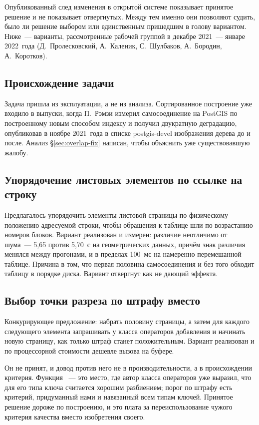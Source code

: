 Опубликованный след изменения в открытой системе показывает принятое решение и
не показывает отвергнутых. Между тем именно они позволяют судить, было ли
решение выбором или единственным пришедшим в голову вариантом. Ниже~---
варианты, рассмотренные рабочей группой в декабре 2021~--- январе 2022~года
(Д.~Пролесковский, А.~Каленик, С.~Шулбаков, А.~Бородин, А.~Коротков).

\subsection{Происхождение задачи}

Задача пришла из эксплуатации, а не из анализа. Сортированное построение уже
входило в выпуски, когда П.~Рэмзи измерил самосоединение на PostGIS по
построенному новым способом индексу и получил двукратную деградацию,
опубликовав в ноябре 2021~года в списке postgis-devel изображения дерева до и
после. Анализ §\ref{sec:overlap-fix} написан, чтобы объяснить уже существовавшую
жалобу.

\subsection{Упорядочение листовых элементов по ссылке на строку}

Предлагалось упорядочить элементы листовой страницы по физическому положению
адресуемой строки, чтобы обращения к таблице шли по возрастанию номеров блоков.
Вариант реализован и измерен: различие неотличимо от шума~--- 5,65 против
5,70~с на геометрических данных, причём знак различия менялся между прогонами,
и в пределах 100~мс на намеренно перемешанной таблице. Причина в том, что
первая половина самосоединения и без того обходит таблицу в порядке диска.
Вариант отвергнут как не дающий эффекта.

\subsection{Выбор точки разреза по штрафу вместо }

Конкурирующее предложение: набрать половину страницы, а затем для каждого
следующего элемента запрашивать у класса операторов  добавления и
начинать новую страницу, как только штраф станет положительным. Вариант
реализован и по процессорной стоимости дешевле вызова  на
буфере.

Он не принят, и довод против него не в производительности, а в происхождении
критерия. Функция ~--- это место, где автор класса операторов
уже выразил, что для его типа ключа считается хорошим разбиением; порог по
штрафу есть критерий, придуманный нами и навязанный всем типам ключей.
Принятое решение дороже по построению, и это плата за переиспользование чужого
критерия качества вместо изобретения своего.

